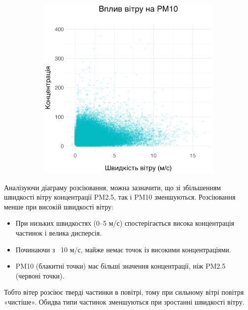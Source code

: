 \documentclass{article}
\begin{document}
\begin{enumerate}
\begin{figure}[h!]
\begin{subfigure}[b]{0.4\linewidth}
            \includegraphics[width=\linewidth]{plots/question1/wind_speed_vs_pm10.png}
        \end{subfigure}
    \end{figure}

    Аналізуючи діаграму розсіювання, можна зазначити, що зі збільшенням швидкості вітру концентрації PM2.5, так і PM10 зменшуються.
    Розсіювання менше при високій швидкості вітру:
    \begin{itemize}
        \item При низьких швидкостях (0–5 м/с) спостерігається висока концентрація частинок і велика дисперсія.
        \item Починаючи з ~10 м/с, майже немає точок із високими концентраціями.
        \item PM10 (блакитні точки) має більші значення концентрації, ніж PM2.5 (червоні точки).
    \end{itemize}
    Тобто вітер розсіює тверді частинки в повітрі, тому при сильному вітрі повітря «чистіше». Обидва типи частинок зменшуються при зростанні швидкості вітру.


\end{enumerate}
\end{document}

